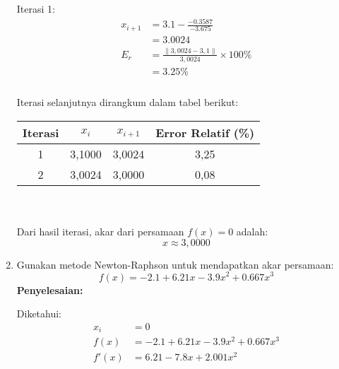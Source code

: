 \documentclass{article}
\newcommand{\penyelesaian}{\textbf{Penyelesaian: }}
\begin{document}
\begin{enumerate}
    Iterasi 1: \\
    \begin{equation*}
    \begin{split}
        x_{i+1} & = \num{3,1} - \frac{-\num{0,3587}}{-\num{3,675}} \\
        & = \num{3,0024} \\
        E_r & = \frac{\|3,0024 - 3,1\|}{3,0024} \times 100\% \\
        & = \num{3,25}\% \\
    \end{split}
    \end{equation*} \\

    Iterasi selanjutnya dirangkum dalam tabel berikut: 
    \begin{table}[h]
        \centering
        \begin{tabular}{cccc}
            \toprule
            Iterasi & $x_i$ & $x_{i+1}$ & Error Relatif (\%) \\
            \midrule
            1 & 3,1000 & 3,0024 & 3,25 \\
            2 & 3,0024 & 3,0000 & 0,08 \\
            \bottomrule
        \end{tabular}
        \label{tab:iterasi}
    \end{table} \\ \\

    Dari hasil iterasi, akar dari persamaan $f(x) = 0$ adalah: \\
    \begin{equation}
        x \approx 3,0000
    \end{equation}

    \item Gunakan metode Newton-Raphson untuk mendapatkan akar persamaan: \\
    \begin{equation*}
        f(x) = -\num{2,1} + \num{6,21}x - \num{3,9}x^2 + \num{0,667}x^3
    \end{equation*}
    \penyelesaian

    Diketahui: \\
    \begin{equation*}
    \begin{split}
        x_i & = 0 \\
        f(x) & = -\num{2,1} + \num{6,21}x - \num{3,9}x^2 + \num{0,667}x^3 \\
        f'(x) & = \num{6,21} - \num{7,8}x + \num{2,001}x^2
    \end{split}
    \end{equation*}


\end{enumerate}
\end{document}
